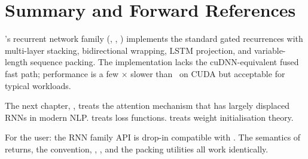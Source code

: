 \section{Summary and Forward References}
\label{sec:rnn_family:summary}

\Lucid's recurrent network family (, ,
) implements the standard gated recurrences with
multi-layer stacking, bidirectional wrapping, LSTM projection,
and variable-length sequence packing. The implementation lacks
the cuDNN-equivalent fused fast path; performance is a few
$\times$ slower than \ on CUDA but acceptable for
typical workloads.

The next chapter, , treats the attention
mechanism that has largely displaced RNNs in modern NLP.
 treats loss functions. 
treats weight initialisation theory.

\begin{lucidnote}
For the user: the RNN family API is drop-in compatible with
. The semantics of  returns, the
 convention, ,
, and the packing utilities all work identically.
\end{lucidnote}
